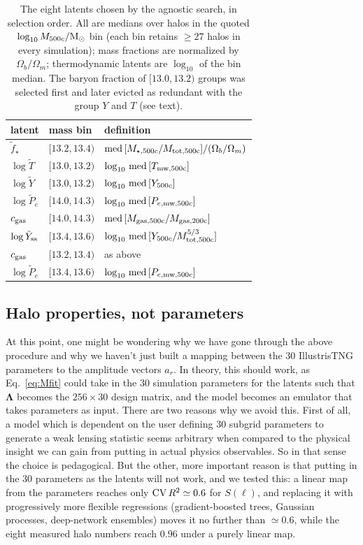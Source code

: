 \documentclass[linenumbers,trackchanges, twocolumn]{aastex701}
\begin{document}
\begin{table}
\centering
\caption{The eight latents chosen by the agnostic search, in selection
order. All are medians over halos in the quoted
$\log_{10} M_{500c}/{\rm M}_\odot$ bin (each bin retains $\ge27$ halos
in every simulation); mass fractions are normalized by
$\Omega_b/\Omega_m$; thermodynamic latents are $\log_{10}$ of the bin
median. The baryon fraction of $[13.0,13.2)$ groups was selected first
and later evicted as redundant with the group $Y$ and $T$ (see text).}
\label{tab:latents}
\begin{tabular}{lll}
\hline
latent & mass bin & definition \\
\hline
$\tilde f_\star$            & $[13.2,13.4)$ & ${\rm med}\,[M_{\star,500c}/M_{\rm tot,500c}]/(\Omega_b/\Omega_m)$ \\
$\log \tilde T$             & $[13.0,13.2)$ & $\log_{10}\,{\rm med}\,[T_{\rm mw,500c}]$ \\
$\log \tilde Y$             & $[13.0,13.2)$ & $\log_{10}\,{\rm med}\,[Y_{500c}]$ \\
$\log \tilde P_e$           & $[14.0,14.3)$ & $\log_{10}\,{\rm med}\,[P_{e,{\rm mw},500c}]$ \\
$c_{\rm gas}$               & $[14.0,14.3)$ & ${\rm med}\,[M_{\rm gas,500c}/M_{\rm gas,200c}]$ \\
$\log \tilde Y_{\rm ss}$    & $[13.4,13.6)$ & $\log_{10}\,{\rm med}\,[Y_{500c}/M_{\rm tot,500c}^{5/3}]$ \\
$c_{\rm gas}$               & $[13.2,13.4)$ & as above \\
$\log \tilde P_e$           & $[13.4,13.6)$ & $\log_{10}\,{\rm med}\,[P_{e,{\rm mw},500c}]$ \\
\hline
\end{tabular}
\end{table}

\subsection{Halo properties, not parameters}\label{sec:why_latents}
At this point, one might be wondering why we have gone through the above procedure and why we haven't just built a mapping between the 30 IllustrisTNG parameters to the amplitude vectors $a_r$. In theory, this should work, as Eq.~\ref{eq:Mfit} could take in the 30 simulation parameters for the latents such that $\bm{\Lambda}$ becomes the $256\times30$ design matrix, and the model becomes an emulator that takes parameters as input. There are two reasons why we avoid this. First of all, a model which is dependent on the user defining 30 subgrid parameters to generate a weak lensing statistic seems arbitrary when compared to the physical insight we can gain from putting in actual physics observables. So in that sense the choice is pedagogical. But the other, more important reason is that putting in the 30 parameters as the latents will not work, and we tested this: a linear map from the parameters reaches only ${\rm CV}\,R^2 \simeq 0.6$ for $S(\ell)$, and replacing it with progressively more flexible regressions (gradient-boosted trees, Gaussian processes, deep-network ensembles) moves it no further than $\simeq 0.6$, while the eight measured halo numbers reach $0.96$ under a purely linear map.
\end{document}
